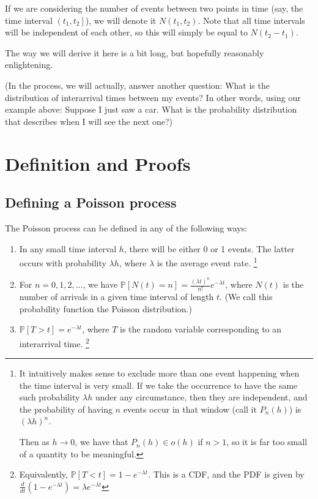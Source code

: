 \documentclass{article}
\begin{document}
If we are considering the number of events between two points in time (say, the time interval $\left(t_1, t_2\right]$), we will denote it $N(t_1, t_2)$. Note that all time intervals will be independent of each other, so this will simply be equal to $N(t_2 - t_1)$. 

The way we will derive it here is a bit long, but hopefully reasonably enlightening. 

(In the process, we will actually, answer another question: What is the distribution of interarrival times between my events? In other words, using our example above: Suppose I just saw a car. What is the probability distribution that describes when I will see the next one?)


\section{Definition and Proofs}

\subsection{Defining a Poisson process}

The Poisson process can be defined in any of the following ways:

\begin{enumerate}
\item In any small time interval $h$, there will be either 0 or 1 events. The latter occurs with probability $\lambda h$, where $\lambda$ is the average event rate. \footnote{It intuitively makes sense to exclude more than one event happening when the time interval is very small. If we take the occurrence to have the same such probability $\lambda h$ under any circumstance, then they are independent, and the probability of having $n$ events occur in that window (call it $P_n(h)$) is $(\lambda h)^n$. 

Then as $h \rightarrow 0$, we have that $P_n(h) \in o(h)$ if $n > 1$, so it is far too small of a quantity to be meaningful.} 
\item For $n = 0, 1, 2, ...$, we have $\mathbb{P}[N(t) = n] = \frac{(\lambda t)^n}{n!}e^{-\lambda t}$, where $N(t)$ is the number of arrivals in a given time interval of length $t$. (We call this probability function the Poisson distribution.)
\item $\mathbb{P}[T > t] = e^{-\lambda t}$, where $T$ is the random variable corresponding to an interarrival time. \footnote{Equivalently, $\mathbb{P}[T < t] = 1 - e^{-\lambda t}$. This is a CDF, and the PDF is given by $\frac{d}{dt}(1 - e^{-\lambda t}) = \lambda e^{-\lambda t}$}
\end{enumerate}
\end{document}
